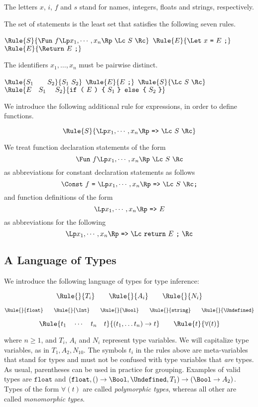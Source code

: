 The letters $x$, $i$, $f$ and $s$ stand for names, integers, floats and strings, respectively.

The set of statements is 
the least set that satisfies the
following seven rules.

$\Rule{S}{\Fun\ f \Lp x_1,\cdots, x_n\Rp\ \Lc\ S\ \Rc}$
\hfill
$\Rule{E}{\Let\ x\ \texttt{=}\ E\ \texttt{;}}$
\hfill
$\Rule{E}{\Return\ E\ \texttt{;}}$

\noindent
The identifiers $x_1,\ldots,x_n$ must be pairwise distinct.

$\Rule{S_1 \qquad S_2}{S_1\ S_2}$
\hfill
$\Rule{E}{E\ \texttt{;}}$
\hfill
$\Rule{S}{\Lc\ S\ \Rc}$
\hfill
$\Rule{E \quad S_1\ \quad S_2}{\texttt{if (}\ E \ \texttt{) \{}\ S_1\ \texttt{\} else \{}\ S_2\ \texttt{\}}}$

\noindent
We introduce the following additional rule for expressions, in order
to define functions.

\[ \Rule{S}{\Lp x_1,\cdots, x_n\Rp\ \texttt{=>}\ \Lc\ S\ \Rc} \]

\noindent
We treat function declaration statements of the form
%
\[ \Fun\ f \Lp x_1,\cdots, x_n\Rp\ \Lc\ S\ \Rc \]
%
\noindent
as abbreviations for constant declaration statements as follows
%
\[ \Const\ f\ \texttt{=}\ \Lp x_1,\cdots, x_n\Rp\ \texttt{=>}\ \Lc\ S\ \Rc \texttt{;} \]
%
and function definitions of the form 
%
\[ \Lp x_1,\cdots, x_n\Rp\ \texttt{=>}\ E \]
%
\noindent
as abbreviations for the following
%
\[ \Lp x_1,\cdots, x_n\Rp\ \texttt{=>}\ \Lc\ \texttt{return}\ E\ \texttt{;}\ \Rc \]

  
\subsection{A Language of Types}
\label{simpltyped}

We introduce the following language of types for type inference:

\[
\Rule{}{T_i}
\qquad
\Rule{}{A_i}
\qquad
\Rule{}{N_i}
\]

\[
\Rule{}{\texttt{float}}
\qquad
\Rule{}{\Int}
\qquad
\Rule{}{\Bool}
\qquad
\Rule{}{\texttt{string}}
\qquad
\Rule{}{\Undefined}
\]

\[ \Rule{t_1 \quad \cdots\quad t_n\quad t}{(t_1, \ldots t_n) \rightarrow t}
\qquad
\Rule{t}{\forall ( t )} \]

\noindent
where $n \geq 1$, and $T_i$, $A_i$ and $N_i$ represent type variables. We will capitalize 
type variables, as in $T_1, A_2, N_{10}$. The symbols $t_i$ in the rules above
are meta-variables that stand for types and must not be confused with type variables
that \emph{are} types.
As usual, parentheses can be used in practice for grouping.
Examples of valid types are $\texttt{float}$ and
$(\texttt{float}, () \rightarrow \Bool, \Undefined, T_1) \rightarrow (\Bool \rightarrow A_2)$.
Types of the form $\forall ( t )$ are called \emph{polymorphic types}, whereas
all other are called \emph{monomorphic types}.

